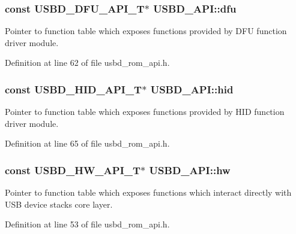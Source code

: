 \subsubsection[{\texorpdfstring{dfu}{dfu}}]{\setlength{\rightskip}{0pt plus 5cm}const {\bf U\+S\+B\+D\+\_\+\+D\+F\+U\+\_\+\+A\+P\+I\+\_\+T}$\ast$ U\+S\+B\+D\+\_\+\+A\+P\+I\+::dfu}\hypertarget{structUSBD__API_ade2d145690a4684babfc683b9cdec47f}{}\label{structUSBD__API_ade2d145690a4684babfc683b9cdec47f}
Pointer to function table which exposes functions provided by D\+FU function driver module. 

Definition at line 62 of file usbd\+\_\+rom\+\_\+api.\+h.

\subsubsection[{\texorpdfstring{hid}{hid}}]{\setlength{\rightskip}{0pt plus 5cm}const {\bf U\+S\+B\+D\+\_\+\+H\+I\+D\+\_\+\+A\+P\+I\+\_\+T}$\ast$ U\+S\+B\+D\+\_\+\+A\+P\+I\+::hid}\hypertarget{structUSBD__API_add4c43d092004fe92e77152d970e877b}{}\label{structUSBD__API_add4c43d092004fe92e77152d970e877b}
Pointer to function table which exposes functions provided by H\+ID function driver module. 

Definition at line 65 of file usbd\+\_\+rom\+\_\+api.\+h.

\subsubsection[{\texorpdfstring{hw}{hw}}]{\setlength{\rightskip}{0pt plus 5cm}const {\bf U\+S\+B\+D\+\_\+\+H\+W\+\_\+\+A\+P\+I\+\_\+T}$\ast$ U\+S\+B\+D\+\_\+\+A\+P\+I\+::hw}\hypertarget{structUSBD__API_a80f452bd8ff7fdff6fb835beb5e3255c}{}\label{structUSBD__API_a80f452bd8ff7fdff6fb835beb5e3255c}
Pointer to function table which exposes functions which interact directly with U\+SB device stack\textquotesingle{}s core layer. 

Definition at line 53 of file usbd\+\_\+rom\+\_\+api.\+h.

